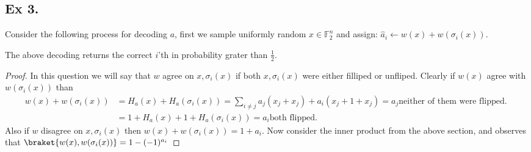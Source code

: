 \documentclass{article}
\newcommand{\FF}{\mathbb{F}}
\begin{document}
\begin{multicols*}{2}
\section{Ex 3.}
Consider the following process for decoding $a$, first we sample uniformly random $x \in \FF_{2}^{n}$ and assign: $\hat{a}_{i} \leftarrow w(x) + w(\sigma_{i}(x))$.
\begin{claim}
  The above decoding returns the correct $i$'th in probability grater than $\frac{1}{2}$. 
\end{claim}
\begin{proof}
  In this question we will say that $w$ agree on $x,\sigma_{i}(x)$ if both $x,\sigma_{i}(x)$ were either filliped or unfliped. Clearly if $w(x)$ agree with $w(\sigma_{i}(x))$ than  
  \begin{equation*}
    \begin{split}
      w\left( x \right) + w\left( \sigma_{i}(x) \right) & = H_{a}(x) + H_{a}(\sigma_{i}(x)) = \sum_{i\neq j }{a_{j}(x_{j} + x_{j})} + a_{i}(x_{j} + 1 + x_{j}) = a_{j} \text{neither of them were flipped. }  \\
      & = 1 + H_{a}(x) + 1 + H_{a}(\sigma_{i}(x)) =  a_{i} \text{both flipped.}
    \end{split}
  \end{equation*}
  Also if $w$ disagree on $x,\sigma_{i}\left( x \right)$ then  $w\left( x \right) + w\left( \sigma_{i}(x) \right) = 1 + a_{i} $.
  Now consider the inner product from the above section, and observes that $\braket{w(x),w(\sigma_{i}(x))} = 1 - (-1)^{a_{i}}$      

\end{proof}

\end{multicols*}
  \printbibliography 
\end{document}
